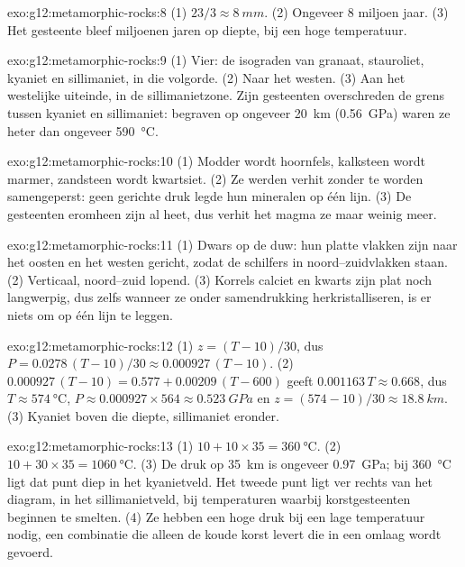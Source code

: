\begin{solution}{exo:g12:metamorphic-rocks:8}
(1) $23/3 \approx \qty{8}{mm}$. (2) Ongeveer 8 miljoen jaar. (3) Het gesteente
bleef miljoenen jaren op diepte, bij een hoge temperatuur.
\end{solution}

\begin{solution}{exo:g12:metamorphic-rocks:9}
(1) Vier: de isograden van granaat, stauroliet, kyaniet en sillimaniet, in die
volgorde. (2) Naar het westen. (3) Aan het westelijke uiteinde, in de sillimanietzone. Zijn
gesteenten overschreden de grens tussen kyaniet en sillimaniet: begraven op ongeveer \qty{20}{km}
(\qty{0.56}{GPa}) waren ze heter dan ongeveer \qty{590}{\celsius}.
\end{solution}

\begin{solution}{exo:g12:metamorphic-rocks:10}
(1) Modder wordt hoornfels, kalksteen wordt marmer, zandsteen wordt
kwartsiet. (2) Ze werden verhit zonder te worden samengeperst: geen gerichte druk
legde hun mineralen op één lijn. (3) De gesteenten eromheen zijn al heet, dus
verhit het magma ze maar weinig meer.
\end{solution}

\begin{solution}{exo:g12:metamorphic-rocks:11}
(1) Dwars op de duw: hun platte vlakken zijn naar het oosten en het westen gericht, zodat de schilfers
in noord--zuidvlakken staan. (2) Verticaal, noord--zuid lopend.
(3) Korrels calciet en kwarts zijn plat noch langwerpig, dus zelfs wanneer ze
onder samendrukking herkristalliseren, is er niets om op één lijn te leggen.
\end{solution}

\begin{solution}{exo:g12:metamorphic-rocks:12}
(1) $z = (T - 10)/30$, dus $P = 0.0278\,(T - 10)/30 \approx
0.000927\,(T - 10)$. (2) $0.000927\,(T - 10) = 0.577 + 0.00209\,(T - 600)$
geeft $0.001163\,T \approx 0.668$, dus $T \approx \qty{574}{\celsius}$, $P
\approx 0.000927 \times 564 \approx \qty{0.523}{GPa}$ en $z = (574 - 10)/30
\approx \qty{18.8}{km}$. (3) Kyaniet boven die diepte, sillimaniet eronder.
\end{solution}

\begin{solution}{exo:g12:metamorphic-rocks:13}
(1) $10 + 10 \times 35 = \qty{360}{\celsius}$. (2) $10 + 30 \times 35 =
\qty{1060}{\celsius}$. (3) De druk op \qty{35}{km} is ongeveer
\qty{0.97}{GPa}; bij \qty{360}{\celsius} ligt dat punt diep in het
kyanietveld. Het tweede punt ligt ver rechts van het diagram, in het
sillimanietveld, bij temperaturen waarbij korstgesteenten beginnen te smelten.
(4) Ze hebben een hoge druk bij een lage temperatuur nodig, een combinatie die alleen
de koude korst levert die in een  omlaag wordt gevoerd.
\end{solution}

